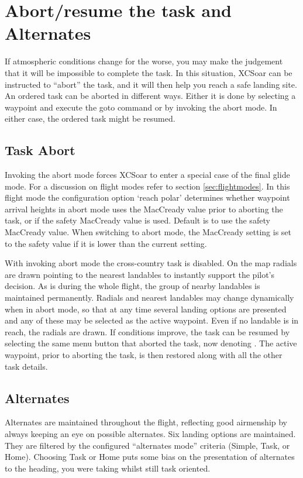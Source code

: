 \section{Abort/resume the task and Alternates}

If atmospheric conditions change for the worse, you may make the
judgement that it will be impossible to complete the task.  In this
situation, XCSoar can be instructed to ``abort'' the task, and it will
then help you reach a safe landing site. An ordered task can be aborted in
different ways. Either it is done by selecting a waypoint and execute the goto
command or by invoking the abort mode. In either case, the ordered task might be resumed.

\subsection*{Task Abort}\label{sec:taskabort}
Invoking the abort mode forces XCSoar to enter a special case of the final glide mode.  For a discussion on
flight modes refer to section \ref{sec:flightmodes}. In this flight mode
the configuration option `reach polar' determines whether
waypoint arrival heights in abort mode uses the MacCready value prior
to aborting the task, or if the safety MacCready value is used. 
Default is to use the safety MacCready value.  When switching to
abort mode, the MacCready setting is set to the safety value
if it is lower than the current setting.

With invoking abort mode the cross-country task is disabled. On the map radials
are drawn pointing to the nearest landables to instantly
support the pilot's decision. As is during the whole flight, the group of nearby
landables is maintained permanently. Radials and nearest landables may change
dynamically when in abort mode, so that at any time several landing options are
presented and any of these may be selected as the active waypoint. Even if no
landable is in reach, the radials are drawn.
If conditions improve, the task can be resumed by selecting the same
menu button that aborted the task, now denoting . The active
waypoint, prior to aborting the task, is then restored along with all the other
task details.

\subsection*{Alternates} \label{sec:alternates}
Alternates are maintained throughout the flight, reflecting good airmenship by
always keeping an eye on possible alternates. Six landing
options are maintained. They are filtered by the configured ``alternates mode''
criteria (Simple, Task, or Home). 
Choosing Task or Home puts some bias on the presentation of alternates to the
heading, you were taking whilst still task oriented.

